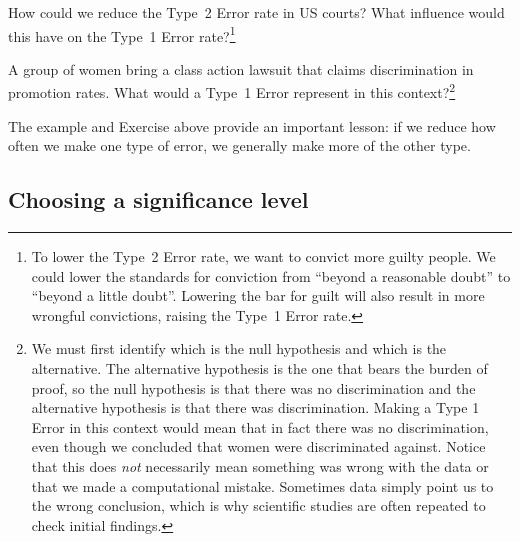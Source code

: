 \begin{exercise} \label{howToReduceType2ErrorsInUSCourts}
How could we reduce the Type~2 Error rate in US courts? What influence would this have on the Type~1 Error rate?\footnote{To lower the Type~2 Error rate, we want to convict more guilty people. We could lower the standards for conviction from ``beyond a reasonable doubt'' to ``beyond a little doubt''. Lowering the bar for guilt will also result in more wrongful convictions, raising the Type~1 Error rate.}
\end{exercise}

\begin{exercise}
A group of women bring a class action lawsuit that claims discrimination in promotion rates. What would a Type~1 Error represent in this context?\footnote{We must first identify which is the null hypothesis and which is the alternative. The alternative hypothesis is the one that bears the burden of proof, so the null hypothesis is that there was no discrimination and the alternative hypothesis is that there was discrimination. Making a Type 1 Error in this context would mean that in fact there was no discrimination, even though we concluded that women were discriminated against. Notice that this does \emph{not} necessarily mean something was wrong with the data or that we made a computational mistake. Sometimes data simply point us to the wrong conclusion, which is why scientific studies are often repeated to check initial findings.}
\end{exercise}


The example and Exercise above provide an important lesson: if we reduce how often we make one type of error, we generally make more of the other type.



\subsection{Choosing a significance level}
\label{significanceLevel}

